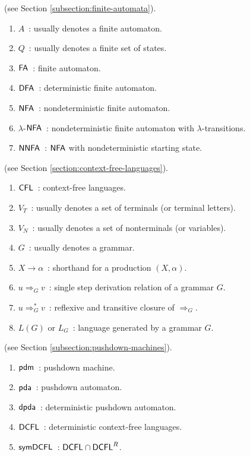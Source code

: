  (see Section \ref{subsection:finite-automata}).

\begin{enumerate}[]
\item $A$\ : usually denotes a finite automaton.
\item $Q$\ : usually denotes a finite set of states.
\item $\textup{\sf FA}$\ : finite automaton.
\item $\textup{\sf DFA}$\ : deterministic finite automaton.
\item $\textup{\sf NFA}$\ : nondeterministic finite automaton.
\item $\lambda$-$\textup{\sf NFA}$\ : nondeterministic finite automaton with $\lambda$-transitions.
\item $\textup{\sf NNFA}$\ : $\textup{\sf NFA}$ with nondeterministic starting state.
\end{enumerate}

 (see Section \ref{section:context-free-languages}).

\begin{enumerate}[]
\item $\textup{\sf CFL}$\ : context-free languages.
\item $V_T$\ : usually denotes a set of terminals (or terminal letters).
\item $V_N$\ : usually denotes a set of nonterminals (or variables).
\item $G$\ : usually denotes a grammar.
\item $X \to \alpha$\ : shorthand for a production $(X, \alpha)$.
\item $u \Rightarrow_G v$\ : single step derivation relation of a grammar $G$.
\item $u \Rightarrow_G^* v$\ : reflexive and transitive closure of $\Rightarrow_G$.
\item $L(G)$ or $L_G$\ : language generated by a grammar $G$.
\end{enumerate}

 (see Section \ref{subsection:pushdown-machines}).

\begin{enumerate}[]
\item $\textup{\sf pdm}$\ : pushdown machine.
\item $\textup{\sf pda}$\ : pushdown automaton.
\item $\textup{\sf dpda}$\ : deterministic pushdown automaton.
\item $\textup{\sf DCFL}$\ : deterministic context-free languages.
\item $\textup{\sf symDCFL}$\ : $\textup{\sf DCFL}\cap\textup{\sf DCFL}^R$.
\end{enumerate}

